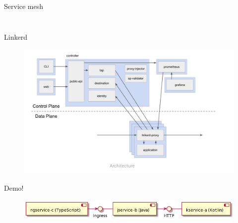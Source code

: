 \documentclass[aspectratio=169]{beamer}
\begin{document}
\begin{frame}{Service mesh}
\begin{columns}[T]
\begin{column}[T]{5cm}
\begin{figure}
    	\end{figure}
\end{column}
\end{columns}


\end{frame}


\begin{frame}{Linkerd}

	\begin{figure}
		\centering
		\includegraphics[width=0.9\linewidth]{Images/linkerd.png}
	\end{figure}


\end{frame}


\begin{frame}{Demo!}

	\begin{figure}
		\centering
		\includegraphics[width=0.9\linewidth]{Images/k8sdemo.png}
	\end{figure}


\end{frame}
\end{document}
